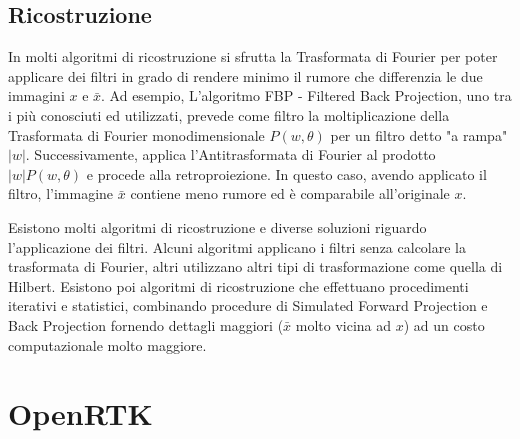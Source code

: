 \documentclass[a4paper,12pt, doubleside]{report}
\begin{document}
            \subsection{Ricostruzione}
                \par
                    In molti algoritmi di ricostruzione si sfrutta la Trasformata di Fourier per poter applicare dei filtri in grado di rendere minimo il rumore che differenzia le due immagini $x$ e $\bar{x}$. Ad esempio, L'algoritmo FBP - Filtered Back Projection, uno tra i più conosciuti ed utilizzati, prevede come filtro la moltiplicazione della Trasformata di Fourier monodimensionale $P(w,\theta)$ per un filtro detto "a rampa" $|w|$. Successivamente, applica l'Antitrasformata di Fourier al prodotto $|w|P(w, \theta)$ e procede alla retroproiezione. In questo caso, avendo applicato il filtro, l'immagine $\bar{x}$ contiene meno rumore ed è comparabile all'originale $x$.
                
                \bigskip        
                \par
                   Esistono molti algoritmi di ricostruzione e diverse soluzioni riguardo l'applicazione dei filtri. Alcuni algoritmi applicano i filtri senza calcolare la trasformata di Fourier, altri utilizzano altri tipi di trasformazione come quella di Hilbert. Esistono poi algoritmi di ricostruzione che effettuano procedimenti iterativi e statistici, combinando procedure di Simulated Forward Projection e Back Projection fornendo dettagli maggiori ($\bar{x}$ molto vicina ad $x$) ad un costo computazionale molto maggiore.
                    
        \section{OpenRTK}
\end{document}
